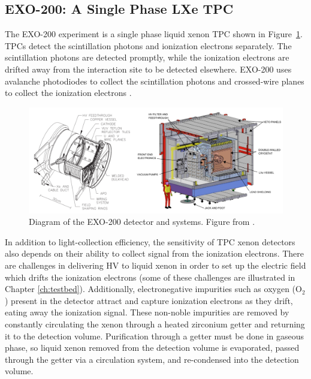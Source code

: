 \subsection{EXO-200: A Single Phase LXe TPC}
The EXO-200 experiment is a single phase liquid xenon \ac{TPC} shown in Figure~\ref{fig:exo200}. \ac{TPC}s detect the scintillation photons and ionization electrons separately. The scintillation photons are detected promptly, while the ionization electrons are drifted away from the interaction site to be detected elsewhere. EXO-200 uses avalanche photodiodes to collect the scintillation photons and crossed-wire planes to collect the ionization electrons \cite{Auger2012}. 

\begin{figure}[htbp]
\begin{center}
\includegraphics[width=\textwidth]{figures/lxetpcs/exo200.png}
\caption{Diagram of the EXO-200 detector and systems. Figure from \cite{Auger2012}. }
\label{fig:exo200}
\end{center}
\end{figure}

In addition to light-collection efficiency, the sensitivity of \ac{TPC} xenon detectors also depends on their ability to collect signal from the ionization electrons. There are challenges in delivering \ac{HV} to liquid xenon in order to set up the electric field which drifts the ionization electrons (some of these challenges are illustrated in Chapter \ref{ch:testbed}). Additionally, electronegative impurities such as oxygen (O$_{2}$) present in the detector attract and capture ionization electrons as they drift, eating away the ionization signal. These non-noble impurities are removed by constantly circulating the xenon through a heated zirconium getter and returning it to the detection volume. Purification through a getter must be done in gaseous phase, so liquid xenon removed from the detection volume is evaporated, passed through the getter via a circulation system, and re-condensed into the detection volume. 

